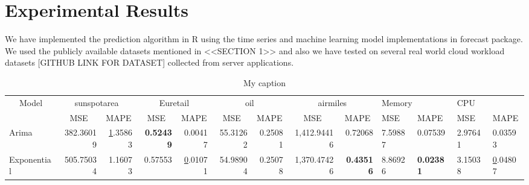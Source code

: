 \section{Experimental Results}
\usepackage{booktabs}
\usepackage{multirow}
\usepackage[normalem]{ulem}
\useunder{\uline}{\ul}{}


We have implemented the prediction algorithm in R using the time series and machine learning model implementations in forecast package. We used the publicly available datasets mentioned in <<SECTION 1>> and also we have tested on several real world cloud workload datasets [GITHUB LINK FOR DATASET] collected from server applications.

\begin{table}[]
\centering
\caption{My caption}
\label{my-label}
\begin{tabular}{@{}|l|r|r|r|r|r|r|r|r|l|l|l|l|@{}}
\toprule
\multicolumn{1}{|c|}{\multirow{2}{*}{Model}} & \multicolumn{2}{c|}{sunspotarea}                                                & \multicolumn{2}{c|}{Euretail}                                        & \multicolumn{2}{c|}{oil}                                              & \multicolumn{2}{c|}{airmiles}                                            & \multicolumn{2}{l|}{Memory}         & \multicolumn{2}{l|}{CPU}            \\ \cmidrule(l){2-13} 
\multicolumn{1}{|c|}{}                       & \multicolumn{1}{c|}{MSE}                & \multicolumn{1}{c|}{MAPE}             & \multicolumn{1}{c|}{MSE}     & \multicolumn{1}{c|}{MAPE}             & \multicolumn{1}{c|}{MSE}               & \multicolumn{1}{c|}{MAPE}    & \multicolumn{1}{c|}{MSE}                  & \multicolumn{1}{c|}{MAPE}    & MSE              & MAPE             & MSE              & MAPE             \\ \midrule
Arima                                        & 382.36019                               & {\ul 1.35863}                         & \textbf{0.52439}             & 0.00417                               & 55.31262                               & 0.25081                      & 1,412.94416                               & 0.72068                      & 7.59887          & 0.07539          & 2.97641          & 0.03593          \\ \midrule
Exponential                                  & 505.75034                               & 1.16073                               & 0.57553                      & {\ul 0.01071}                         & 54.98904                               & 0.25078                      & 1,370.47426                               & \textbf{0.43516}             & 8.86926          & \textbf{0.02381} & 3.15038          & {\ul 0.04807}    \\ \midrule

\end{tabular}
\end{table}
